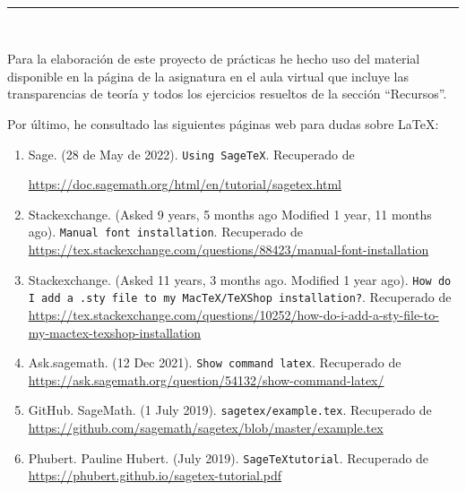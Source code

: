  \newpage
 \begin{center}
	{\fboxrule=4pt } \\
	\rule{15cm}{0pt} \\
\end{center}
\par Para la elaboración de este proyecto de prácticas he hecho uso del material disponible en la 
página de la asignatura en el aula virtual que incluye las transparencias de teoría y todos los 
ejercicios resueltos de la sección ``Recursos''.
\par Por último, he consultado las siguientes páginas web para dudas sobre \LaTeX:
\begin{enumerate}
	\item Sage. (28 de May de 2022). \texttt{Using Sage\TeX}. Recuperado de 
	\raggedright\url{https://doc.sagemath.org/html/en/tutorial/sagetex.html}
	\item Stackexchange. (Asked 9 years, 5 months ago
	Modified 1 year, 11 months ago). \texttt{Manual font installation}. Recuperado de 
	\url{https://tex.stackexchange.com/questions/88423/manual-font-installation}
	\item Stackexchange. (Asked 11 years, 3 months ago. Modified 1 year ago). 
	\texttt{How do I add a .sty file to my MacTeX/TeXShop installation?}. Recuperado de 
	\url{https://tex.stackexchange.com/questions/10252/how-do-i-add-a-sty-file-to-my-mactex-texshop-installation}
	\item Ask.sagemath. (12 Dec 2021). \texttt{Show command latex}. Recuperado de 
	\url{https://ask.sagemath.org/question/54132/show-command-latex/}
	\item GitHub. SageMath. (1 July 2019). \texttt{sagetex/example.tex}. Recuperado de 
	\url{https://github.com/sagemath/sagetex/blob/master/example.tex}
	\item Phubert. Pauline Hubert. (July 2019). \texttt{Sage\TeX tutorial}. Recuperado de 
	\url{https://phubert.github.io/sagetex-tutorial.pdf}
\end{enumerate}


